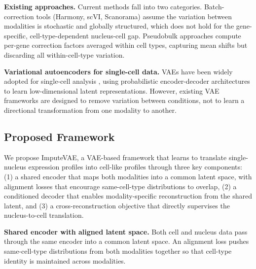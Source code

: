 \documentclass[11pt]{article}
\begin{document}
\textbf{Existing approaches.} Current methods fall into two categories. Batch-correction tools (Harmony, scVI, Scanorama) assume the variation between modalities is stochastic and globally structured, which does not hold for the gene-specific, cell-type-dependent nucleus-cell gap. Pseudobulk approaches \citep{crowell2020muscat} compute per-gene correction factors averaged within cell types, capturing mean shifts but discarding all within-cell-type variation.

\textbf{Variational autoencoders for single-cell data.} VAEs have been widely adopted for single-cell analysis \citep{lopez2018deep, gayoso2021joint, xu2021probabilistic}, using probabilistic encoder-decoder architectures to learn low-dimensional latent representations. However, existing VAE frameworks are designed to remove variation between conditions, not to learn a directional transformation from one modality to another.

\subsection*{Proposed Framework}

We propose ImputeVAE, a VAE-based framework that learns to translate single-nucleus expression profiles into cell-like profiles through three key components: (1) a shared encoder that maps both modalities into a common latent space, with alignment losses that encourage same-cell-type distributions to overlap, (2) a conditioned decoder that enables modality-specific reconstruction from the shared latent, and (3) a cross-reconstruction objective that directly supervises the nucleus-to-cell translation.


\textbf{Shared encoder with aligned latent space.} Both cell and nucleus data pass through the same encoder into a common latent space. An alignment loss pushes same-cell-type distributions from both modalities together so that cell-type identity is maintained across modalities.
\end{document}
